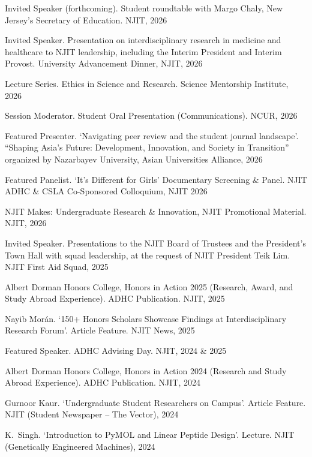 \documentclass[10pt,a4paper]{article}
\begin{document}
\begin{cvitems}
  \item Invited Speaker (forthcoming). Student roundtable with Margo Chaly, New Jersey's Secretary of Education. NJIT, 2026
  \item Invited Speaker. Presentation on interdisciplinary research in medicine and healthcare to NJIT leadership, including the Interim President and Interim Provost. University Advancement Dinner, NJIT, 2026
  \item Lecture Series. Ethics in Science and Research. Science Mentorship Institute, 2026
  \item Session Moderator. Student Oral Presentation (Communications). NCUR, 2026
  \item Featured Presenter. `Navigating peer review and the student journal landscape'. ``Shaping Asia's Future: Development, Innovation, and Society in Transition'' organized by Nazarbayev University, Asian Universities Alliance, 2026
  \item Featured Panelist. `It's Different for Girls' Documentary Screening \& Panel. NJIT ADHC \& CSLA Co-Sponsored Colloquium, NJIT 2026
  \item NJIT Makes: Undergraduate Research \& Innovation, NJIT Promotional Material. NJIT, 2026
  \item Invited Speaker. Presentations to the NJIT Board of Trustees and the President's Town Hall with squad leadership, at the request of NJIT President Teik Lim. NJIT First Aid Squad, 2025
  \item Albert Dorman Honors College, Honors in Action 2025 (Research, Award, and Study Abroad Experience). ADHC Publication. NJIT, 2025
  \item Nayib Morán. `150+ Honors Scholars Showcase Findings at Interdisciplinary Research Forum'. Article Feature. NJIT News, 2025
  \item Featured Speaker. ADHC Advising Day. NJIT, 2024 \& 2025
  \item Albert Dorman Honors College, Honors in Action 2024 (Research and Study Abroad Experience). ADHC Publication. NJIT, 2024
  \item Gurnoor Kaur. `Undergraduate Student Researchers on Campus'. Article Feature. NJIT (Student Newspaper -- The Vector), 2024
  \item K.~Singh. `Introduction to PyMOL and Linear Peptide Design'. Lecture. NJIT (Genetically Engineered Machines), 2024
\end{cvitems}


\end{document}
